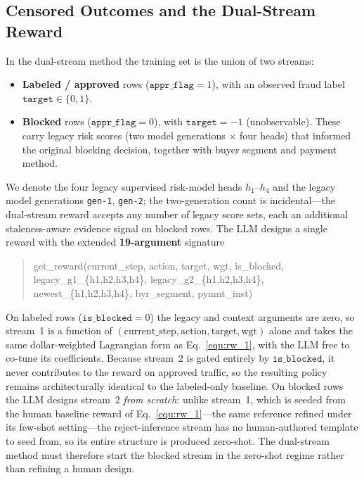 \documentclass[11pt]{article}
\begin{document}
\subsection{Censored Outcomes and the Dual-Stream Reward}
\label{sec:dualstream}
In the dual-stream method the training set is the union of two streams:
\begin{itemize}
\item \textbf{Labeled / approved} rows ($\texttt{appr\_flag}=1$), with an observed fraud
label $\texttt{target}\in\{0,1\}$.
\item \textbf{Blocked} rows ($\texttt{appr\_flag}=0$), with $\texttt{target}=-1$
(unobservable). These carry legacy risk scores (two model generations $\times$ four heads)
that informed the original blocking decision, together with buyer segment and payment
method.
\end{itemize}
We denote the four legacy supervised risk-model heads $h_1$--$h_4$ and the legacy model
generations \texttt{gen-1}, \texttt{gen-2}; the two-generation count is incidental---the
dual-stream reward accepts any number of legacy score sets, each an additional
staleness-aware evidence signal on blocked rows.
The LLM designs a single reward with the extended \textbf{19-argument} signature
\begin{quote}\small\ttfamily
get\_reward(current\_step, action, target, wgt, is\_blocked, legacy\_g1\_\{h1,h2,h3,h4\},
legacy\_g2\_\{h1,h2,h3,h4\}, newest\_\{h1,h2,h3,h4\}, byr\_segment, pymnt\_inst)
\end{quote}
On labeled rows ($\texttt{is\_blocked}=0$) the legacy and context arguments are zero, so
stream~1 is a function of $(\text{current\_step}, \text{action}, \text{target},
\text{wgt})$ alone and takes the same dollar-weighted Lagrangian form as
Eq.~\ref{equ:rw_1}, with the LLM free to co-tune its coefficients. Because stream~2 is
gated entirely by $\texttt{is\_blocked}$, it never contributes to the reward on approved
traffic, so the resulting policy remains architecturally identical to the labeled-only
baseline. On blocked rows the LLM designs stream~2 \emph{from scratch}: unlike stream~1, which is
seeded from the human baseline reward of Eq.~\ref{equ:rw_1}---the same reference \citet{qu2025llmenhanced}
refined under its few-shot setting---the reject-inference stream has no human-authored template
to seed from, so its entire structure is produced zero-shot. The dual-stream method must therefore start the
blocked stream in the zero-shot regime rather than refining a human design.
\end{document}
